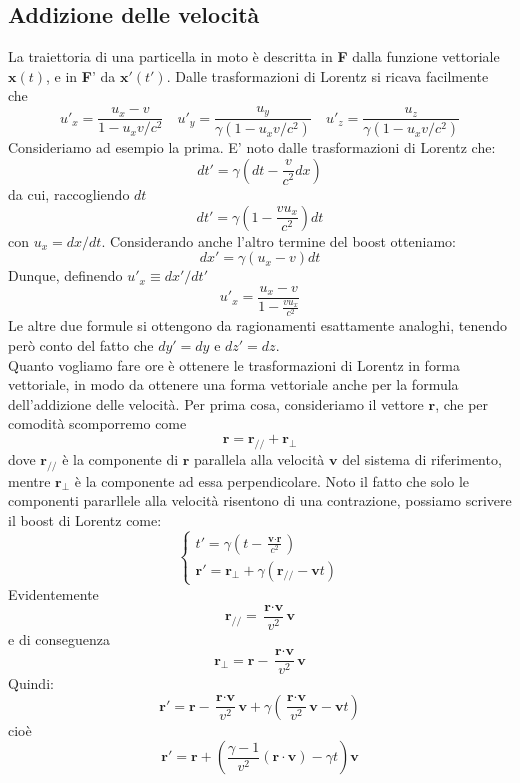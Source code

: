 \documentclass[a4paper,11pt]{book}
\theoremstyle{plain}
\theoremstyle{definition}
\begin{document}
\subsection{Addizione delle velocità}
La traiettoria di una particella in moto è descritta in \textbf{F} dalla funzione vettoriale $\textbf{x}(t)$, e in \textbf{F}' da $\textbf{x}'(t')$. Dalle trasformazioni di Lorentz si ricava facilmente che
\begin{equation}\label{eq:addizione}
u'_x = \frac{u_x-v}{1-u_xv/c^2} \quad u'_y=\frac{u_y}{\gamma(1-u_xv/c^2)} \quad u'_z = \frac{u_z}{\gamma(1-u_xv/c^2)}
\end{equation}
Consideriamo ad esempio la prima. E' noto dalle trasformazioni di Lorentz che:
\[
dt' = \gamma \left( dt-\frac{v}{c^2}dx \right)
\]
da cui, raccogliendo $dt$
\[
dt' = \gamma\left( 1-\frac{vu_x}{c^2} \right)dt
\]
con $u_x=dx/dt$. Considerando anche l'altro termine del boost otteniamo:
\[
dx' = \gamma(u_x-v)dt
\]
Dunque, definendo $u'_x\equiv dx'/dt'$
\[
u'_x=\frac{u_x-v}{1-\frac{vu_x}{c^2}}
\]
Le altre due formule si ottengono da ragionamenti esattamente analoghi, tenendo però conto del fatto che $dy'=dy$ e $dz'=dz$. \\
Quanto vogliamo fare ore è ottenere le trasformazioni di Lorentz in forma vettoriale, in modo da ottenere una forma vettoriale anche per la formula dell'addizione delle velocità. Per prima cosa, consideriamo il vettore $\textbf{r}$, che per comodità scomporremo come
\[
\textbf{r}=\textbf{r}_{//}+\textbf{r}_{\perp}
\]
dove $\textbf{r}_{//}$ è la componente di $\textbf{r}$ parallela alla velocità $\textbf{v}$ del sistema di riferimento, mentre $\textbf{r}_{\perp}$ è la componente ad essa perpendicolare. Noto il fatto che solo le componenti pararllele alla velocità risentono di una contrazione, possiamo scrivere il boost di Lorentz come:
\[
\begin{cases}
t' = \gamma \left( t-\frac{\textbf{v}\cdot \textbf{r}}{c^2} \right) \\
\textbf{r}'=\textbf{r}_{\perp}+\gamma(\textbf{r}_{//}-\textbf{v}t)
\end{cases}
\]
Evidentemente
\[
\textbf{r}_{//}=\frac{\textbf{r}\cdot \textbf{v}}{v^2}\textbf{v}
\]
e di conseguenza
\[
\textbf{r}_{\perp}=\textbf{r}-\frac{\textbf{r}\cdot \textbf{v}}{v^2}\textbf{v}
\]
Quindi:
\[
\textbf{r}'=\textbf{r}-\frac{\textbf{r}\cdot \textbf{v}}{v^2}\textbf{v}+\gamma \left( \frac{\textbf{r}\cdot \textbf{v}}{v^2}\textbf{v}-\textbf{v}t \right)
\]
cioè
\[
\textbf{r}'=\textbf{r}+\left( \frac{\gamma-1}{v^2}(\textbf{r}\cdot\textbf{v})-\gamma t \right)\textbf{v}
\]
\end{document}
